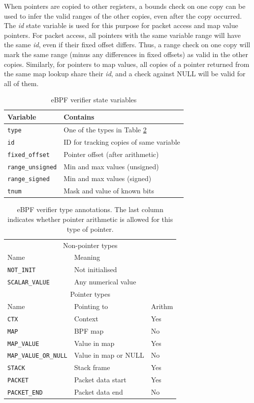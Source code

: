 \documentclass[10pt]{sig-alternate-05-2015}
\begin{document}
When pointers are copied to other registers, a bounds check on one copy can be
used to infer the valid ranges of the other copies, even after the copy
occurred. The \emph{id} state variable is used for this purpose for packet access and
map value pointers. For packet access, all pointers with the same variable
range will have the same \emph{id}, even if their fixed offset differs. Thus, a range
check on one copy will mark the same range (minus any differences in fixed
offsets) as valid in the other copies. Similarly, for pointers to map values,
all copies of a pointer returned from the same map lookup share their \emph{id}, and
a check against NULL will be valid for all of them.

\begin{table}[htbp]
\caption{\label{tbl:vrf-state-vars}
eBPF verifier state variables}
\centering
\begin{tabular}{ll}
\toprule
Variable & Contains\\
\midrule
\texttt{type} & One of the types in Table \ref{tbl:reg-types}\\
\texttt{id} & ID for tracking copies of same variable\\
\texttt{fixed\_offset} & Pointer offset (after arithmetic)\\
\texttt{range\_unsigned} & Min and max values (unsigned)\\
\texttt{range\_signed} & Min and max values (signed)\\
\texttt{tnum} & Mask and value of known bits\\
\bottomrule
\end{tabular}
\end{table}

\begin{table}[htbp]
\caption{\label{tbl:reg-types}
eBPF verifier type annotations. The last column indicates whether pointer arithmetic is allowed for this type of pointer.}
\centering
\begin{tabular}{lll}
\toprule
\multicolumn{3}{c}{Non-pointer types} \\
Name & Meaning \\
\midrule
\texttt{NOT\_INIT}            & Not initialised         \\
\texttt{SCALAR\_VALUE}        & Any numerical value       \\
\midrule
\multicolumn{3}{c}{Pointer types} \\
Name & Pointing to & Arithm\\
\midrule
\texttt{CTX}                  & Context              & Yes \\
\texttt{MAP}                  & BPF map              & No  \\
\texttt{MAP\_VALUE}           & Value in map         & Yes \\
\texttt{MAP\_VALUE\_OR\_NULL} & Value in map or NULL & No  \\
\texttt{STACK}                & Stack frame          & Yes \\
\texttt{PACKET}               & Packet data start    & Yes \\
\texttt{PACKET\_END}          & Packet data end      & No  \\
\bottomrule
\end{tabular}
\end{table}
\end{document}
